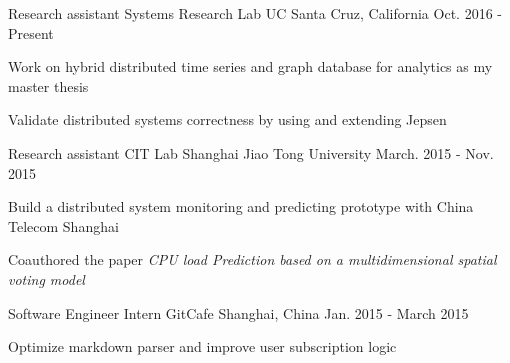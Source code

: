 

\begin{cventries}

  \cventry
    {Research assistant} %
    {Systems Research Lab} %
    {UC Santa Cruz, California} %
    {Oct. 2016 - Present} %
    {
      \begin{cvitems} %
        \item {Work on hybrid distributed time series and graph database for analytics as my master thesis}
        \item {Validate distributed systems correctness by using and extending Jepsen}
      \end{cvitems}
    }

    \cventry
      {Research assistant} %
      {CIT Lab} %
      {Shanghai Jiao Tong University} %
      {March. 2015 - Nov. 2015} %
      {
        \begin{cvitems} %
          \item {Build a distributed system monitoring and predicting prototype with China Telecom Shanghai}
          \item {Coauthored the paper \textit{CPU load Prediction based on a multidimensional spatial voting model}}
        \end{cvitems}
      }


  \cventry
    {Software Engineer Intern} %
    {GitCafe} %
    {Shanghai, China} %
    {Jan. 2015 - March 2015} %
    {
      \begin{cvitems} %
        \item {Optimize markdown parser and improve user subscription logic}
      \end{cvitems}
    }


\end{cventries}
